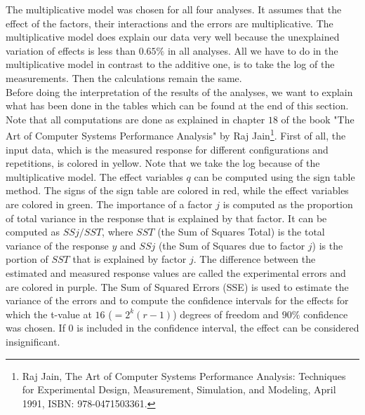 The multiplicative model was chosen for all four analyses. It assumes that the effect of the factors, their interactions and the errors are multiplicative. The multiplicative model does explain our data very well because the unexplained variation of effects is less than $0.65\%$ in all analyses.
All we have to do in the multiplicative model in contrast to the additive one, is to take the log of the measurements. Then the calculations remain the same.  \\

Before doing the interpretation of the results of the analyses, we want to explain what has been done in the tables which can be found at the end of this section. Note that all computations are done as explained in chapter $18$ of the book "The Art of Computer Systems Performance Analysis" by Raj Jain\footnote{Raj Jain, The Art of Computer Systems Performance Analysis: Techniques for Experimental Design, Measurement, Simulation, and Modeling, April 1991, ISBN: 978-0471503361.}. 
First of all, the input data, which is the measured response for different configurations and repetitions, is colored in yellow. Note that we take the log because of the multiplicative model. 
The effect variables $q$ can be computed using the sign table method. The signs of the sign table are colored in red, while the effect variables are colored in green. The importance of a factor $j$ is computed as the proportion of total variance in the response that is explained by that factor. It can be computed as $SSj/SST$, where $SST$ (the Sum of Squares Total) is the total variance of the response $y$ and $SSj$ (the Sum of Squares due to factor $j$) is the portion of $SST$ that is explained by factor $j$.
The difference between the estimated and measured response values are called the experimental errors and are colored in purple. The Sum of Squared Errors (SSE) is used to estimate the variance of the errors and to compute the confidence intervals for the effects for which the t-value at $16$ ($=2^k(r-1)$) degrees of freedom and $90\%$ confidence was chosen. If $0$ is included in the confidence interval, the effect can be considered insignificant. \\


